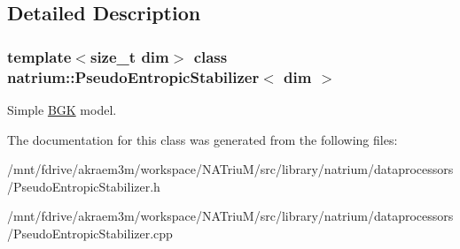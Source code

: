 \subsection{Detailed Description}
\subsubsection*{template$<$size\_\-t dim$>$ class natrium::PseudoEntropicStabilizer$<$ dim $>$}

Simple \hyperlink{classnatrium_1_1BGK}{BGK} model. 

The documentation for this class was generated from the following files:\begin{DoxyCompactItemize}
\item 
/mnt/fdrive/akraem3m/workspace/NATriuM/src/library/natrium/dataprocessors/PseudoEntropicStabilizer.h\item 
/mnt/fdrive/akraem3m/workspace/NATriuM/src/library/natrium/dataprocessors/PseudoEntropicStabilizer.cpp\end{DoxyCompactItemize}
